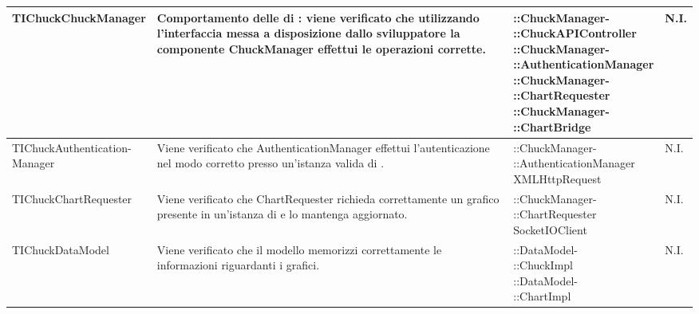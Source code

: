 \begin{longtabu}{| X | X | X[0.9] | X[0.3] |}
	TIChuckChuckManager
				&
Comportamento delle  di : viene verificato che utilizzando l'interfaccia messa a disposizione dallo sviluppatore la componente ChuckManager effettui le operazioni corrette.
			& \parbox[t]{0.6\textwidth}{
::ChuckManager-\\::ChuckAPIController\\
::ChuckManager-\\::AuthenticationManager\\
::ChuckManager-\\::ChartRequester\\
::ChuckManager-\\::ChartBridge}
			& N.I.
			\\ \hline


	
	\parbox[t]{0.6\textwidth}{TIChuckAuthentication-\\Manager}
				&
Viene verificato che AuthenticationManager effettui l'autenticazione nel modo corretto presso un'istanza valida di .
			& \parbox[t]{0.6\textwidth}{
::ChuckManager-\\::AuthenticationManager\\
XMLHttpRequest}
			& N.I.
			\\ \hline



	TIChuckChartRequester
				&
Viene verificato che ChartRequester richieda correttamente un grafico presente in un'istanza di  e lo mantenga aggiornato.
			& \parbox[t]{0.6\textwidth}{
::ChuckManager-\\::ChartRequester\\
SocketIOClient}
			& N.I.
			\\ \hline



	TIChuckDataModel
				&
Viene verificato che il modello memorizzi correttamente le informazioni riguardanti i grafici.
			& \parbox[t]{0.6\textwidth}{
::DataModel-\\::ChuckImpl\\
::DataModel-\\::ChartImpl}
			& N.I.
			\\ \hline




\end{longtabu}
